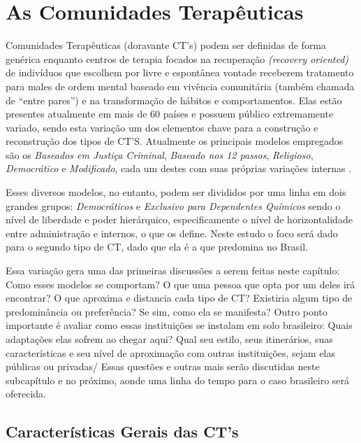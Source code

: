 \documentclass[
	12pt,				%
	oneside,			%
	a4paper,			%
	sumario=tradicional,
	english,			%
	brazil				%
	]{abntex2}
\begin{document}
\pagebreak

\hypertarget{as-comunidades-terapuxeauticas}{%
\section{As Comunidades Terapêuticas}\label{as-comunidades-terapuxeauticas}}

Comunidades Terapêuticas (doravante CT's) podem ser definidas de forma genérica enquanto centros de terapia focados na recuperação \emph{(recovery oriented)} de indivíduos que escolhem por livre e espontânea vontade receberem tratamento para males de ordem mental baseado em vivência comunitária (também chamada de ``entre pares'') e na transformação de hábitos e comportamentos. Elas estão presentes atualmente em mais de 60 países \autocite[87]{avery_current_2019} e possuem público extremamente variado, sendo esta variação um dos elementos chave para a construção e reconstrução dos tipos de CT'S. Atualmente os principais modelos empregados são os \emph{Baseados em Justiça Criminal}, \emph{Baseado nos 12 passos}, \emph{Religioso}, \emph{Democrático} e \emph{Modificado}, cada um destes com suas próprias variações internas \autocite[37]{avery_modern_2019}.

Esses diversos modelos, no entanto, podem ser divididos por uma linha em dois grandes grupos: \emph{Democráticos} e \emph{Exclusivo para Dependentes Químicos} sendo o nível de liberdade e poder hierárquico, especificamente o nível de horizontalidade entre administração e internos, o que os define. Neste estudo o foco será dado para o segundo tipo de \acrshort{CT}, dado que ela é a que predomina no Brasil.

Essa variação gera uma das primeiras discussões a serem feitas neste capítulo: Como esses modelos se comportam? O que uma pessoa que opta por um deles irá encontrar? O que aproxima e distancia cada tipo de CT? Existiria algum tipo de predominância ou preferência? Se sim, como ela se manifesta? Outro ponto importante é avaliar como essas instituições se instalam em solo brasileiro: Quais adaptações elas sofrem ao chegar aqui? Qual seu estilo, seus itinerários, suas características e seu nível de aproximação com outras instituições, sejam elas públicas ou privadas/ Essas questões e outras mais serão discutidas neste subcapítulo e no próximo, aonde uma linha do tempo para o caso brasileiro será oferecida.

\hypertarget{caracteruxedsticas-gerais-das-cts}{%
\subsection{Características Gerais das CT's}\label{caracteruxedsticas-gerais-das-cts}}
\end{document}
